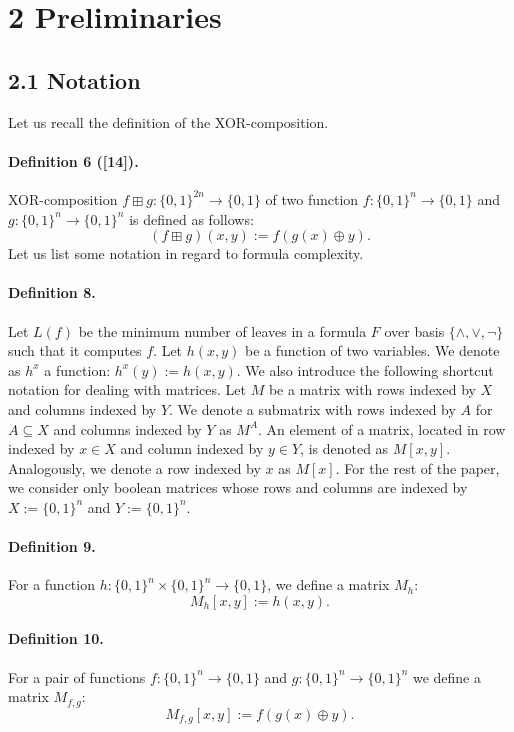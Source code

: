 \section*{2 Preliminaries}
\subsection*{2.1 Notation}
Let us recall the definition of the XOR-composition.
\paragraph{Definition 6 ([14]).} XOR-composition $f\boxplus g:\{0,1\}^{2n}\to\{0,1\}$ of two function $f:\{0,1\}^n\to\{0,1\}$ and $g:\{0,1\}^n\to\{0,1\}^n$ is defined as follows:
\[(f\boxplus g)(x,y):=f(g(x)\oplus y).\]
Let us list some notation in regard to formula complexity.
\paragraph{Definition 8.} Let $L(f)$ be the minimum number of leaves in a formula $F$ over basis $\{\wedge,\vee,\neg\}$ such that it computes $f$.
Let $h(x,y)$ be a function of two variables. We denote as $h^x$ a function: $h^x(y):=h(x,y)$.
We also introduce the following shortcut notation for dealing with matrices. Let $M$ be a matrix with rows indexed by $X$ and columns indexed by $Y$. We denote a submatrix with rows indexed by $A$ for $A\subseteq X$ and columns indexed by $Y$ as $M^A$. An element of a matrix, located in row indexed by $x\in X$ and column indexed by $y\in Y$, is denoted as $M[x,y]$. Analogously, we denote a row indexed by $x$ as $M[x]$.
For the rest of the paper, we consider only boolean matrices whose rows and columns are indexed by $X:=\{0,1\}^n$ and $Y:=\{0,1\}^n$.
\paragraph{Definition 9.} For a function $h:\{0,1\}^n\times\{0,1\}^n\to\{0,1\}$, we define a matrix $M_h$:
\[M_h[x,y]:=h(x,y).\]
\paragraph{Definition 10.} For a pair of functions $f:\{0,1\}^n\to\{0,1\}$ and $g:\{0,1\}^n\to\{0,1\}^n$ we define a matrix $M_{f,g}$:
\[M_{f,g}[x,y]:=f(g(x)\oplus y).\]
